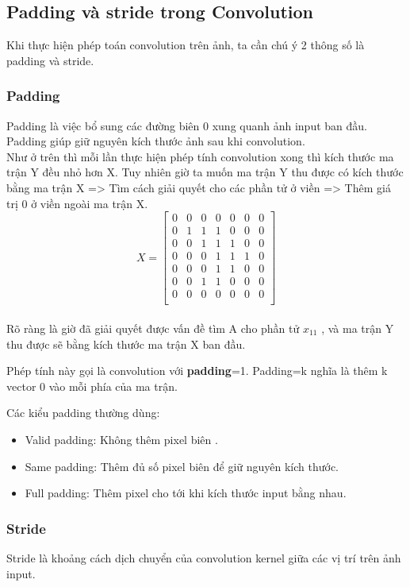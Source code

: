 \subsection{Padding và stride trong Convolution}
Khi thực hiện phép toán convolution trên ảnh, ta cần chú ý 2 thông số là padding và stride.
\subsubsection{Padding}
Padding là việc bổ sung các đường biên 0 xung quanh ảnh input ban đầu. Padding giúp giữ nguyên kích thước ảnh sau khi convolution.\\

Như ở trên thì mỗi lần thực hiện phép tính convolution xong thì kích thước ma trận Y đều nhỏ hơn X. Tuy nhiên giờ ta muốn ma trận Y thu được có kích thước bằng ma trận X => Tìm cách giải quyết cho các phần tử ở viền => Thêm giá trị 0 ở viền ngoài ma trận X.\\
\begin{equation}
X= \begin{bmatrix}
    0 & 0 & 0 & 0 & 0 & 0 & 0 \\
    0 & 1 & 1 & 1 & 0 & 0 & 0 \\
    0 & 0 & 1 & 1 & 1 & 0 & 0 \\
    0 & 0 & 0 & 1 & 1 & 1 & 0 \\
    0 & 0 & 0 & 1 & 1 & 0 & 0 \\
    0 & 0 & 1 & 1 & 0 & 0 & 0 \\
    0 & 0 & 0 & 0 & 0 & 0 & 0 \\
\end{bmatrix}
\end{equation}
\\
Rõ ràng là giờ đã giải quyết được vấn đề tìm A cho phần tử \(x_{11}\) , và ma trận Y thu được sẽ bằng kích thước ma trận X ban đầu.

Phép tính này gọi là convolution với \textbf{padding}=1. Padding=k nghĩa là thêm k vector 0 vào mỗi phía của ma trận.

Các kiểu padding thường dùng:

\begin{itemize}
\item Valid padding: Không thêm pixel biên .
\item Same padding: Thêm đủ số pixel biên để giữ nguyên kích thước.
\item Full padding: Thêm pixel cho tới khi kích thước input bằng nhau.
\end{itemize}
\subsubsection{Stride}
Stride là khoảng cách dịch chuyển của convolution kernel giữa các vị trí trên ảnh input.

